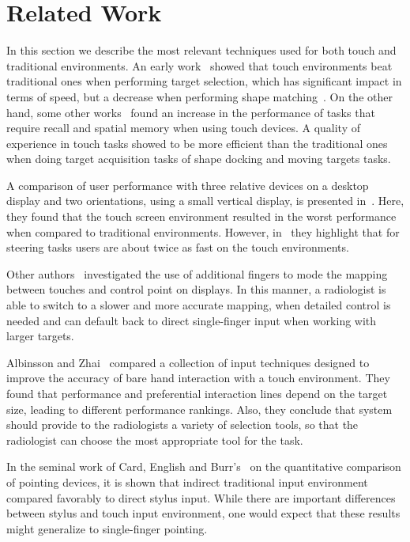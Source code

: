 \documentclass{sigchi}
\begin{document}
\section{Related Work}

In this section we describe the most relevant techniques used for both touch and traditional environments. 
An early work~\cite{shanis2003comparison} showed that touch environments beat traditional ones when performing target selection, which has significant impact in terms of speed, but a decrease when performing shape matching~\cite{forlines2007direct}. On the other hand, some other works~\cite{tan2002kinesthetic, wallace1972spatial, nacher2016kindergarten} found an increase in the performance of tasks that require recall and spatial memory when using touch devices. A quality of experience in touch tasks showed to be more efficient than the traditional ones when doing target acquisition tasks of shape docking and moving targets tasks.

A comparison of user performance with three relative devices on a desktop display and two  orientations, using a small vertical display, is presented in~\cite{meyer1994device}. Here, they found that the touch screen environment resulted in the worst performance  when compared to traditional environments. However, in~\cite{accot1997beyond} they highlight that for steering tasks users are about twice as fast on the touch environments.

Other authors~\cite{benko2006precise, esenther2006fluid} investigated the use of additional fingers to mode the mapping between touches and control point on displays. In this manner, a radiologist is able to switch to a slower and more accurate mapping, when detailed control is needed and can default back to direct single-finger input when working with larger targets.

Albinsson and Zhai~\cite{albinsson2003high} compared a collection of input techniques designed to improve the accuracy of bare hand interaction with a touch environment. 
They found that performance and preferential interaction lines depend on the target size, leading to different performance rankings. Also, they conclude that system should provide to the radiologists a variety of selection tools, so that the radiologist can choose the most appropriate tool for the task.

In the seminal work of Card, English and Burr's~\cite{card1978evaluation} on the quantitative comparison of pointing devices, it is shown that indirect traditional input environment compared  favorably to direct stylus input. While there are important differences between stylus and touch input environment, one would expect that these results might generalize to single-finger pointing.
\end{document}
